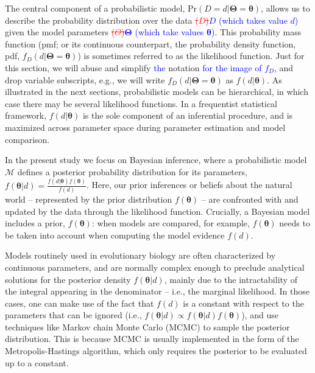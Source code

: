\documentclass[oneside]{article}
\begin{document}
The central component of a probabilistic model, $\text{Pr}(D=d|\boldsymbol{\Theta}=\boldsymbol{\theta})$, allows us to describe the probability distribution over the data \textcolor{red}{\st{($D$)}}\textcolor{blue}{$D$ (which takes value $d$)} given the model parameters \textcolor{red}{\st{($\Theta$)}}\textcolor{blue}{$\boldsymbol{\Theta}$ (which take values $\boldsymbol{\theta}$)}.
This probability mass function (pmf; or its continuous counterpart, the probability density function, pdf, $f_D(d|\boldsymbol{\Theta}=\boldsymbol{\theta})$) is sometimes referred to as the likelihood function.
Just for this section, we will abuse and simplify \textcolor{blue}{the} notation \textcolor{blue}{for the image of $f_D$}, and drop variable subscripts, e.g., we will write $f_D(d|\boldsymbol{\Theta}=\boldsymbol{\theta})$ as $f(d|\boldsymbol{\theta})$.
As illustrated in the next sections, probabilistic models can be hierarchical, in which case there may be several likelihood functions.
In a frequentist statistical framework, $f(d|\boldsymbol{\theta})$ is the sole component of an inferential procedure, and is maximized across parameter space during parameter estimation and model comparison.

In the present study we focus on Bayesian inference, where a probabilistic model $\mathcal{M}$ defines a posterior  probability distribution for its parameters, $f(\boldsymbol{\theta}|d) = \frac{f(d|\boldsymbol{\theta})f(\boldsymbol{\theta})}{f(d)}$.
Here, our prior inferences or beliefs about the natural world -- represented by the prior distribution $f(\boldsymbol{\theta})$ -- are confronted with and updated by the data through the likelihood function.
Crucially, a Bayesian model includes a prior, $f(\boldsymbol{\theta})$: when models are compared, for example, $f(\boldsymbol{\theta})$ needs to be taken into account when computing the model evidence $f(d)$.

Models routinely used in evolutionary biology are often characterized by continuous parameters, and are normally complex enough to preclude analytical solutions for the posterior density $f(\boldsymbol{\theta}|d)$, mainly due to the intractability of the integral appearing in the denominator -- i.e., the marginal likelihood.
In those cases, one can make use of the fact that $f(d)$ is a constant with respect to the parameters that can be ignored (i.e., $f(\boldsymbol{\theta}|d) \propto f(\boldsymbol{\theta}|d)f(\boldsymbol{\theta})$), and use techniques like Markov chain Monte Carlo (MCMC) to sample the posterior distribution.
This is because MCMC is usually implemented in the form of the Metropolis-Hastings \citep{metropolis53,mh} algorithm, which only requires the posterior to be evaluated up to a constant.
\end{document}
